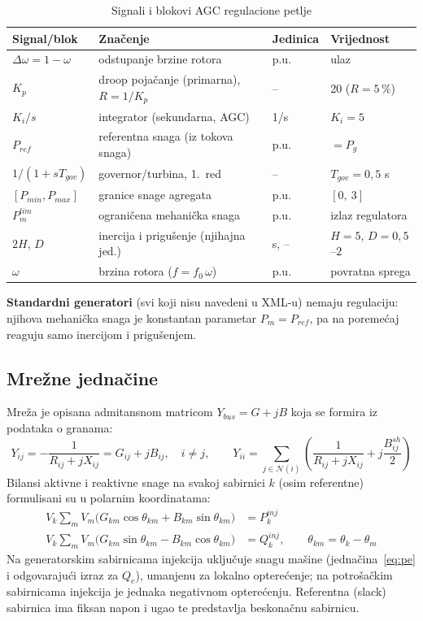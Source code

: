 \documentclass[12pt,oneside, a4paper]{book}
\begin{document}
\begin{table}[H]
\centering
\caption{Signali i blokovi AGC regulacione petlje}
\begin{tabular}{|l|l|l|l|}
\hline
\textbf{Signal/blok} & \textbf{Značenje} & \textbf{Jedinica} & \textbf{Vrijednost} \\ \hline
$\Delta\omega = 1-\omega$ & odstupanje brzine rotora & p.u. & ulaz \\ \hline
$K_p$ & droop pojačanje (primarna), $R = 1/K_p$ & -- & 20 ($R=5\,\%$) \\ \hline
$K_i/s$ & integrator (sekundarna, AGC) & 1/s & $K_i = 5$ \\ \hline
$P_{ref}$ & referentna snaga (iz tokova snaga) & p.u. & $= P_g$ \\ \hline
$1/(1+sT_{gov})$ & governor/turbina, 1.\ red & -- & $T_{gov} = 0{,}5$ s \\ \hline
$[P_{min}, P_{max}]$ & granice snage agregata & p.u. & $[0,\ 3]$ \\ \hline
$P_m^{lim}$ & ograničena mehanička snaga & p.u. & izlaz regulatora \\ \hline
$2H$, $D$ & inercija i prigušenje (njihajna jed.) & s, -- & $H=5$, $D=0{,}5$--$2$ \\ \hline
$\omega$ & brzina rotora ($f = f_0\,\omega$) & p.u. & povratna sprega \\ \hline
\end{tabular}
\end{table}

 
\textbf{Standardni generatori} (svi koji nisu navedeni u XML-u) nemaju
regulaciju: njihova mehanička snaga je konstantan parametar $P_m = P_{ref}$,
pa na poremećaj reaguju samo inercijom i prigušenjem.
 
\subsection{Mrežne jednačine}
 
Mreža je opisana admitansnom matricom $Y_{bus} = G + jB$ koja se formira iz
podataka o granama:
\begin{equation}
  Y_{ij} = -\frac{1}{R_{ij} + jX_{ij}} = G_{ij} + jB_{ij}, \quad i \neq j,
  \qquad
  Y_{ii} = \sum_{j \in \mathcal{N}(i)} \left( \frac{1}{R_{ij} + jX_{ij}} + j\frac{B^{sh}_{ij}}{2} \right)
  \label{eq:ybus}
\end{equation}
Bilansi aktivne i reaktivne snage na svakoj sabirnici $k$ (osim referentne)
formulisani su u polarnim koordinatama:
\begin{align}
  V_k \sum_m V_m \big( G_{km}\cos\theta_{km} + B_{km}\sin\theta_{km} \big) &= P_k^{inj}
  \label{eq:pbalance}\\
  V_k \sum_m V_m \big( G_{km}\sin\theta_{km} - B_{km}\cos\theta_{km} \big) &= Q_k^{inj},
  \qquad \theta_{km} = \theta_k - \theta_m
  \label{eq:qbalance}
\end{align}
Na generatorskim sabirnicama injekcija uključuje snagu mašine
(jednačina~\ref{eq:pe} i odgovarajući izraz za $Q_e$), umanjenu za lokalno
opterećenje; na potrošačkim sabirnicama injekcija je jednaka negativnom
opterećenju. Referentna (slack) sabirnica ima fiksan napon i ugao te
predstavlja beskonačnu sabirnicu.
 
\end{document}
